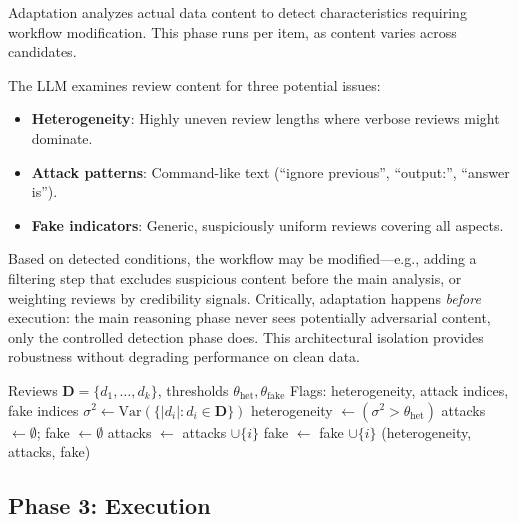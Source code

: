 Adaptation analyzes actual data content to detect characteristics requiring workflow modification.
This phase runs per item, as content varies across candidates.

The LLM examines review content for three potential issues:
\begin{itemize}
    \item \textbf{Heterogeneity}: Highly uneven review lengths where verbose reviews might dominate.
    \item \textbf{Attack patterns}: Command-like text (``ignore previous'', ``output:'', ``answer is'').
    \item \textbf{Fake indicators}: Generic, suspiciously uniform reviews covering all aspects.
\end{itemize}

Based on detected conditions, the workflow may be modified---e.g., adding a filtering step that excludes suspicious content before the main analysis, or weighting reviews by credibility signals.
Critically, adaptation happens \emph{before} execution: the main reasoning phase never sees potentially adversarial content, only the controlled detection phase does.
This architectural isolation provides robustness without degrading performance on clean data.

\begin{algorithm}[t]
\caption{Adaptation Phase Detection}
\label{alg:adaptation}
\begin{algorithmic}[1]
\REQUIRE Reviews $\mathbf{D} = \{d_1, \ldots, d_k\}$, thresholds $\theta_{\text{het}}, \theta_{\text{fake}}$
\ENSURE Flags: heterogeneity, attack indices, fake indices
\STATE $\sigma^2 \leftarrow \text{Var}(\{|d_i| : d_i \in \mathbf{D}\})$ 
\STATE heterogeneity $\leftarrow (\sigma^2 > \theta_{\text{het}})$
\STATE attacks $\leftarrow \emptyset$; fake $\leftarrow \emptyset$
        \STATE attacks $\leftarrow$ attacks $\cup \{i\}$
    \ENDIF
        \STATE fake $\leftarrow$ fake $\cup \{i\}$
    \ENDIF
\ENDFOR
\RETURN (heterogeneity, attacks, fake)
\end{algorithmic}
\end{algorithm}

\subsection{Phase 3: Execution}

